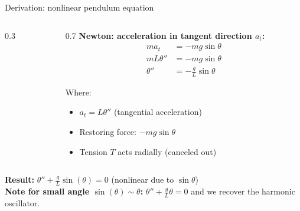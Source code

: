 \documentclass{beamer}
\begin{document}
\begin{frame}{Derivation: nonlinear pendulum equation}

    \begin{columns}
        \begin{column}{0.3\textwidth}
  \begin{center}

      \end{center}
    \end{column}
    \begin{column}{0.7\textwidth}
      \small
      \textbf{Newton: acceleration in tangent direction $a_t$:}
      \begin{align}
        ma_t &= -mg\sin\theta \\
        m L \theta'' &= -mg\sin\theta \\
        \theta'' &= -\frac{g}{L}\sin\theta
      \end{align}
      
      \vspace{0.5em}
      Where:
      \begin{itemize}
        \item $a_t = L\theta''$ (tangential acceleration)
        \item Restoring force: $-mg\sin\theta$
        \item Tension $T$ acts radially (canceled out)
      \end{itemize}
    \end{column}
  \end{columns}
  
  \vspace{0.5em}
  \textbf{Result:} $\theta'' + \frac{g}{L}\sin(\theta) = 0$ (nonlinear due to $\sin\theta$)\\

  \textbf{Note for small angle $\sin(\theta) \sim \theta$:} $\theta'' + \frac{g}{L} \theta = 0$ and we recover the harmonic oscillator.
\end{frame}
\end{document}
